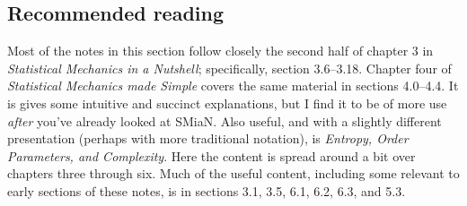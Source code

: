 \documentclass{article}
\begin{document}
\subsection*{Recommended reading}
Most of the notes in this section follow closely the second half of chapter 3 in \emph{Statistical Mechanics in a Nutshell}; specifically, section 3.6--3.18. Chapter four of \emph{Statistical Mechanics made Simple} covers the same material in sections 4.0--4.4. It is gives some intuitive and succinct explanations, but I find it to be of more use \emph{after} you've already looked at SMiaN. Also useful, and with a slightly different presentation (perhaps with more traditional notation), is \emph{Entropy, Order Parameters, and Complexity}. Here the content is spread around a bit over chapters three through six. Much of the useful content, including some relevant to early sections of these notes, is in sections 3.1, 3.5, 6.1, 6.2, 6.3, and 5.3.
\end{document}
